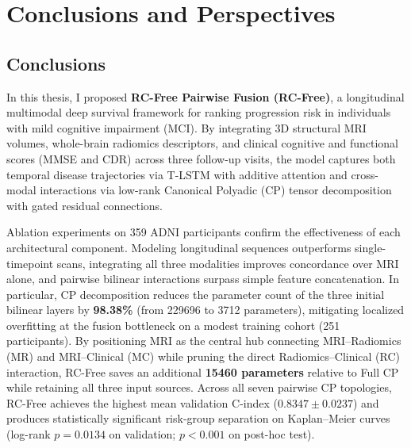 \chapter{Conclusions and Perspectives}
\label{chap:discussion}

\section{Conclusions}
In this thesis, I proposed \textbf{RC-Free Pairwise Fusion (RC-Free)}, a longitudinal multimodal deep survival framework for ranking progression risk in individuals with mild cognitive impairment (MCI). By integrating 3D structural MRI volumes, whole-brain radiomics descriptors, and clinical cognitive and functional scores (MMSE and CDR) across three follow-up visits, the model captures both temporal disease trajectories via T-LSTM with additive attention and cross-modal interactions via low-rank Canonical Polyadic (CP) tensor decomposition with gated residual connections.

Ablation experiments on 359 ADNI participants confirm the effectiveness of each architectural component. Modeling longitudinal sequences outperforms single-timepoint scans, integrating all three modalities improves concordance over MRI alone, and pairwise bilinear interactions surpass simple feature concatenation. In particular, CP decomposition reduces the parameter count of the three initial bilinear layers by \textbf{98.38\%} (from 229696 to 3712 parameters), mitigating localized overfitting at the fusion bottleneck on a modest training cohort (251 participants). By positioning MRI as the central hub connecting MRI--Radiomics (MR) and MRI--Clinical (MC) while pruning the direct Radiomics--Clinical (RC) interaction, RC-Free saves an additional \textbf{15460 parameters} relative to Full CP while retaining all three input sources. Across all seven pairwise CP topologies, RC-Free achieves the highest mean validation C-index ($0.8347\pm0.0237$) and produces statistically significant risk-group separation on Kaplan--Meier curves (log-rank $p=0.0134$ on validation; $p<0.001$ on post-hoc test).


